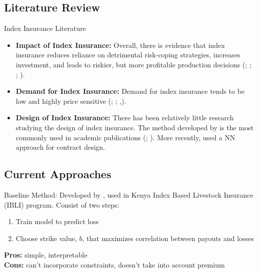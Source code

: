 \documentclass{beamer}
\begin{document}
\subsection{Literature Review}
\begin{frame}{Index Insurance Literature}
    \begin{itemize}
        \item \textbf{Impact of Index Insurance:} Overall, there is evidence that index insurance reduces reliance on detrimental risk-coping strategies, increases investment, and leads to riskier, but more profitable production decisions (\cite{jensen2017agricultural};  \cite{cole2013barriers}; \cite{mobarak2013informal}; \cite{karlan2014agricultural}).
        \item \textbf{Demand for Index Insurance:} Demand for index insurance tends to be low and highly price sensitive (\cite{jensen2017agricultural};  \cite{cole2013barriers}; \cite{cai2020subsidy},\cite{casaburi2018time}).
        \item \textbf{Design of Index Insurance:} There has been relatively little research studying the design of index insurance. The method developed by \cite{chantarat2013designing} is the most commonly used in academic publications (\cite{jensen2019does};  \cite{flatnes2018improving}). More recently, \cite{chen2023managing} used a NN approach for contract design. 
    \end{itemize}
   \end{frame}


\subsection{Current Approaches}
\begin{frame}{Baseline Method: \cite{chantarat2013designing}}
    Developed by \cite{chantarat2013designing}, used in Kenya Index Based Livestock Insurance (IBLI) program.  Consist of two steps: 
    \vspace{5mm}
    \begin{enumerate}
        \item Train model to predict loss
        \item Choose strike value, $b$, that maximizes correlation between payouts and losses
    \end{enumerate}

    \vspace{5mm}
    \textbf{Pros:} simple, interpretable \\
    \textbf{Cons:} can't incorporate constraints, doesn't take into account premium 
    
\end{frame}
\end{document}
